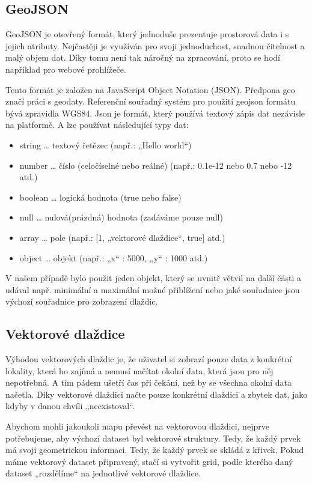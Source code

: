 \documentclass[12pt]{article}
\begin{document}
\subsection{GeoJSON}
GeoJSON je otevřený formát, který jednoduše prezentuje prostorová data i s jejich atributy. Nejčastěji je využíván pro svoji jednoduchost, snadnou čitelnost a malý objem dat. Díky tomu není tak náročný na zpracování, proto se hodí například pro webové prohlížeče.

Tento formát je založen na JavaScript Object Notation (JSON). Předpona geo značí práci s geodaty. Referenční souřadný systém pro použití geojson formátu bývá zpravidla WGS84. Json je formát, který používá textový zápis dat nezávisle na platformě. A lze používat následující typy dat:

\begin{itemize}
	\item string … textový řetězec (např.: „Hello world“)
	\item number … číslo (celočíselné nebo reálné) (např.: 0.1e-12 nebo 0.7 nebo -12 atd.)
	\item boolean … logická hodnota (true nebo false)
	\item null … nulová(prázdná) hodnota (zadáváme pouze null)
	\item array … pole (např.: [1, „vektorové dlaždice“, true] atd.)
	\item object … objekt (např.: {„x“ : 5000, „y“ : 1000} atd.)
\end{itemize}

V našem případě bylo použit jeden objekt, který se uvnitř větvil na další části a udával např. minimální a maximální možné přiblížení nebo jaké souřadnice jsou výchozí souřadnice pro zobrazení dlaždic.

\subsection{Vektorové dlaždice}
Výhodou vektorových dlaždic je, že uživatel si zobrazí pouze data z konkrétní lokality, která ho zajímá a nemusí načítat okolní data, která jsou pro něj nepotřebná. A tím pádem ušetří čas při čekání, než by se všechna okolní data načetla. Díky vektorové dlaždici načte pouze konkrétní dlaždici a zbytek dat, jako kdyby v danou chvíli „neexistoval“.

Abychom mohli jakoukoli mapu převést na vektorovou dlaždici, nejprve potřebujeme, aby výchozí dataset byl vektorové struktury. Tedy, že každý prvek má svoji geometrickou informaci. Tedy, že každý prvek se skládá z křivek. Pokud máme vektorový dataset připravený, stačí si vytvořit grid, podle kterého daný dataset „rozdělíme“ na jednotlivé vektorové dlaždice.
\end{document}
